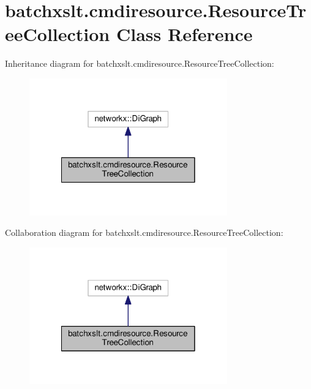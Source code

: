 \hypertarget{classbatchxslt_1_1cmdiresource_1_1_resource_tree_collection}{}\section{batchxslt.\+cmdiresource.\+Resource\+Tree\+Collection Class Reference}
\label{classbatchxslt_1_1cmdiresource_1_1_resource_tree_collection}


Inheritance diagram for batchxslt.\+cmdiresource.\+Resource\+Tree\+Collection\+:
\nopagebreak
\begin{figure}[H]
\begin{center}
\leavevmode
\includegraphics[width=242pt]{d0/d95/classbatchxslt_1_1cmdiresource_1_1_resource_tree_collection__inherit__graph}
\end{center}
\end{figure}


Collaboration diagram for batchxslt.\+cmdiresource.\+Resource\+Tree\+Collection\+:
\nopagebreak
\begin{figure}[H]
\begin{center}
\leavevmode
\includegraphics[width=242pt]{d0/d11/classbatchxslt_1_1cmdiresource_1_1_resource_tree_collection__coll__graph}
\end{center}
\end{figure}
